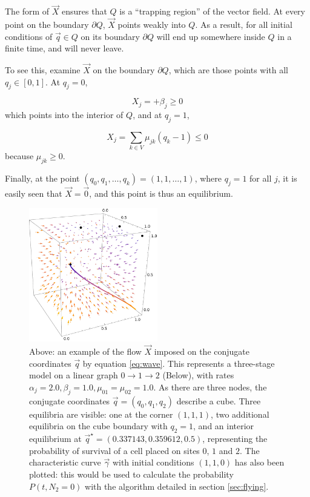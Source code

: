 \documentclass{article}
\begin{document}
The form of $\vec{X}$ ensures that $Q$ is a ``trapping region'' of the
vector field. At every point on the boundary $\partial Q$, $\vec{X}$ points weakly
into $Q$. As a result, for all initial conditions of $\vec{q} \in Q$ on its
boundary $\partial Q$ will end up somewhere inside $Q$ in a finite time, and will never leave.

To see this, examine $\vec{X}$ on the boundary $\partial Q$, which are those
points with all $q_j \in [0, 1]$. At $q_j = 0$,

\begin{equation*}
    X_j = +\beta_j \geq 0
\end{equation*}
which points into the interior of $Q$, and at $q_j = 1$,

\begin{equation*}
    X_j = \sum_{k \in V} \mu_{jk} (q_k - 1) \leq 0
\end{equation*}
because $\mu_{jk} \geq 0$.

Finally, at the point $(q_0, q_1, \dots, q_k) = (1,1,\dots,1)$, where $q_j=1$
for all $j$, it is easily seen that $\vec{X} = \vec{0}$, and this point is thus
an equilibrium.

\begin{figure}
    \includegraphics[width=0.5\textwidth]{figures/flowcube1}
    \caption{\label{fig:cube}Above: an example of the flow $\vec{X}$ imposed on the
    conjugate coordinates $\vec{q}$ by equation \eqref{eq:wave}. This represents
    a three-stage model on a linear graph $0 \rightarrow 1 \rightarrow 2$ (Below), with rates $\alpha_j = 2.0, \beta_j = 1.0, \mu_{01} = \mu_{02} = 1.0$. As
    there are three nodes, the conjugate coordinates $\vec{q}=(q_0,q_1,q_2)$
    describe a cube. Three equilibria are visible: one at the corner $(1,1,1)$,
    two additional equilibria on the cube boundary with $q_2 = 1$, and
    an interior equilibrium at $\vec{q}^\star = (0.337143, 0.359612, 0.5)$, representing the
    probability of survival of a cell placed on sites $0$, $1$ and $2$. The characteristic
    curve $\vec{\gamma}$ with initial conditions $(1,1,0)$ has also been
    plotted: this would be used to calculate the probability $P(t,N_2 = 0)$ with
    the algorithm detailed in section \ref{sec:flying}.}
\end{figure}
\end{document}
